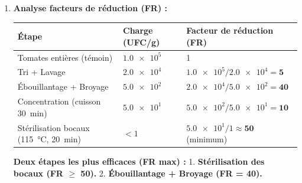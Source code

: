 \documentclass[11pt]{article}
\begin{document}
\begin{corrige}
\begin{enumerate}
\item \textbf{Analyse facteurs de réduction (FR) :}
\begin{center}
\begin{tabularx}{\linewidth}{|l|X|X|}\hline
\rowcolor{popblueL} \textbf{Étape} & \textbf{Charge (UFC/g)} & \textbf{Facteur de réduction (FR)} \\ \hline
Tomates entières (témoin) & $\num{1,0e5}$ & 1 \\ \hline
Tri + Lavage & $\num{2,0e4}$ & $\num{1,0e5} / \num{2,0e4} = \mathbf{5}$ \\ \hline
Ébouillantage + Broyage & $\num{5,0e2}$ & $\num{2,0e4} / \num{5,0e2} = \mathbf{40}$ \\ \hline
Concentration (cuisson \SI{30}{\minute}) & $\num{5,0e1}$ & $\num{5,0e2} / \num{5,0e1} = \mathbf{10}$ \\ \hline
Stérilisation bocaux (\SI{115}{\degreeCelsius}, \SI{20}{\minute}) & $< 1$ & $\num{5,0e1} / 1 \approx \mathbf{50}$ (minimum) \\ \hline
\end{tabularx}
\end{center}
\textbf{Deux étapes les plus efficaces (FR max) :}
1. \textbf{Stérilisation des bocaux (FR $\ge$ 50).}
2. \textbf{Ébouillantage + Broyage (FR = 40).}


\end{enumerate}
\end{corrige}
\end{document}
